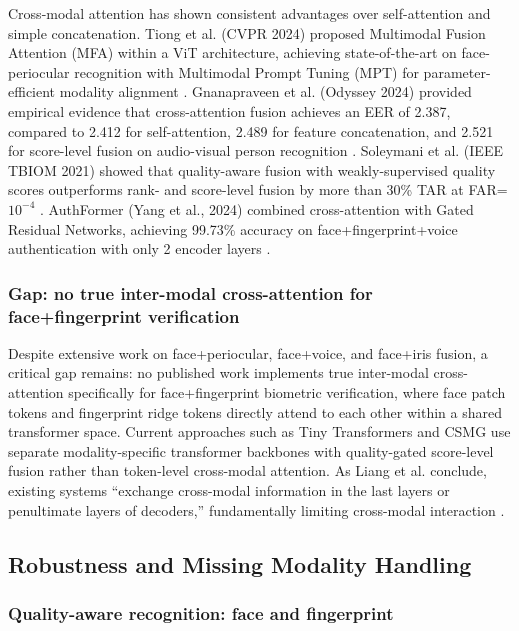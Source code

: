 \documentclass[10pt,journal,compsoc]{IEEEtran}
\begin{document}
Cross-modal attention has shown consistent advantages over self-attention and simple concatenation. Tiong et al. (CVPR 2024) proposed Multimodal Fusion Attention (MFA) within a ViT architecture, achieving state-of-the-art on face-periocular recognition with Multimodal Prompt Tuning (MPT) for parameter-efficient modality alignment \cite{REF1}. Gnanapraveen et al. (Odyssey 2024) provided empirical evidence that cross-attention fusion achieves an EER of 2.387, compared to 2.412 for self-attention, 2.489 for feature concatenation, and 2.521 for score-level fusion on audio-visual person recognition \cite{REF3}. Soleymani et al. (IEEE TBIOM 2021) showed that quality-aware fusion with weakly-supervised quality scores outperforms rank- and score-level fusion by more than 30\% TAR at FAR=$10^{-4}$ \cite{REF2}. AuthFormer (Yang et al., 2024) combined cross-attention with Gated Residual Networks, achieving 99.73\% accuracy on face+fingerprint+voice authentication with only 2 encoder layers \cite{REF8}.

\subsubsection{Gap: no true inter-modal cross-attention for face+fingerprint verification}

Despite extensive work on face+periocular, face+voice, and face+iris fusion, a critical gap remains: no published work implements true inter-modal cross-attention specifically for face+fingerprint biometric verification, where face patch tokens and fingerprint ridge tokens directly attend to each other within a shared transformer space. Current approaches such as Tiny Transformers \cite{REF10} and CSMG \cite{REF11} use separate modality-specific transformer backbones with quality-gated score-level fusion rather than token-level cross-modal attention. As Liang et al. conclude, existing systems ``exchange cross-modal information in the last layers or penultimate layers of decoders,'' fundamentally limiting cross-modal interaction \cite{REF11}.

\subsection{Robustness and Missing Modality Handling}

\subsubsection{Quality-aware recognition: face and fingerprint}
\end{document}
